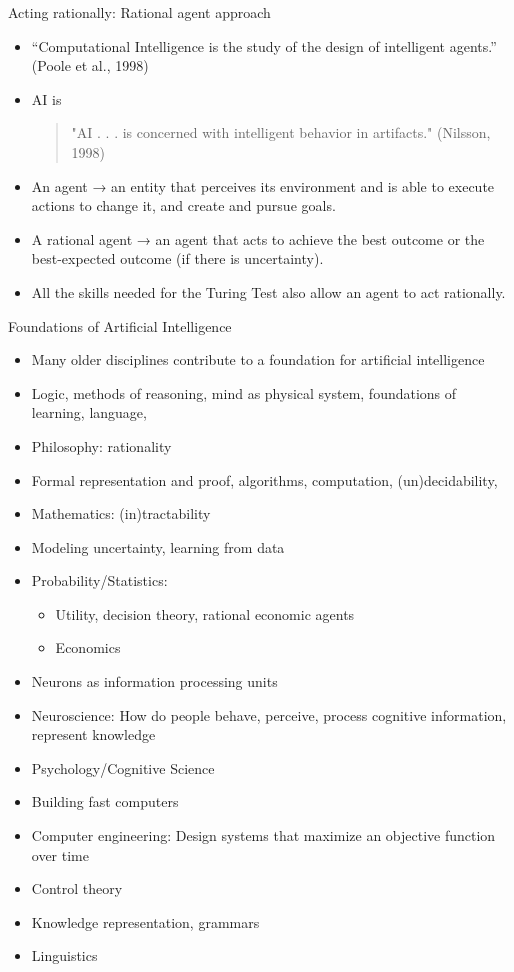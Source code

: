 \documentclass{beamer}
\begin{document}
\begin{frame}{Acting rationally: Rational agent approach}
\begin{itemize}
    \item “Computational Intelligence is the study of the design of intelligent agents.”
    (Poole et al., 1998)
    \item AI is
    \begin{quote}
        "AI . . . is concerned with intelligent behavior in artifacts."
    (Nilsson, 1998)
    \end{quote}
    \item An agent → an entity that perceives its environment and is able to execute actions to change it, and create and pursue goals.
    \item A rational agent → an agent that acts to achieve the best outcome or the best-expected outcome (if there is uncertainty).
    \item All the skills needed for the Turing Test also allow an agent to act rationally.
\end{itemize}
\end{frame}

\begin{frame}{Foundations of Artificial Intelligence}
\begin{itemize}
    \item Many older disciplines contribute to a foundation for artificial intelligence
    \item Logic, methods of reasoning, mind as physical system, foundations of learning, language,
    \item Philosophy: rationality
    \item Formal representation and proof, algorithms, computation, (un)decidability,
    \item Mathematics: (in)tractability
    \item Modeling uncertainty, learning from data
    \item Probability/Statistics:
    \begin{itemize}
        \item Utility, decision theory, rational economic agents
        \item Economics
    \end{itemize}
    \item Neurons as information processing units
    \item Neuroscience: How do people behave, perceive, process cognitive information, represent knowledge
    \item Psychology/Cognitive Science
    \item Building fast computers
    \item Computer engineering: Design systems that maximize an objective function over time
    \item Control theory
    \item Knowledge representation, grammars
    \item Linguistics
\end{itemize}
\end{frame}
\end{document}
